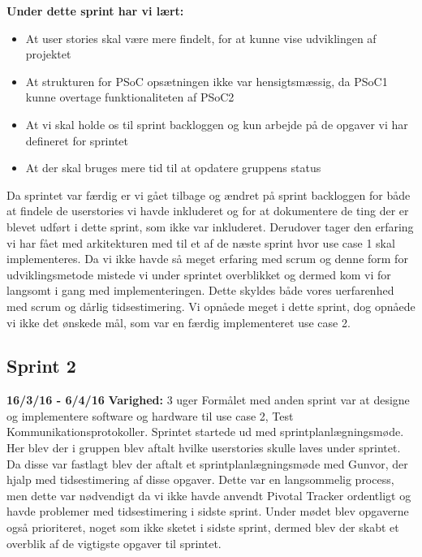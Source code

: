 	\textbf{Under dette sprint har vi lært:}
	\begin{itemize}
		\item At user stories skal være mere findelt, for at kunne vise udviklingen af projektet
		\item At strukturen for PSoC opsætningen ikke var hensigtsmæssig, da PSoC1 kunne overtage funktionaliteten af PSoC2
		\item At vi skal holde os til sprint backloggen og kun arbejde på de opgaver vi har defineret for sprintet
		\item At der skal bruges mere tid til at opdatere gruppens status
	\end{itemize}
	
	Da sprintet var færdig er vi gået tilbage og ændret på sprint backloggen for både at findele de userstories vi havde inkluderet og for at dokumentere de ting der er blevet udført i dette sprint, som ikke var inkluderet. Derudover tager den erfaring vi har fået med arkitekturen med til et af de næste sprint hvor use case 1 skal implementeres. Da vi ikke havde så meget erfaring med scrum og denne form for udviklingsmetode mistede vi under sprintet overblikket og dermed kom vi for langsomt i gang med implementeringen. Dette skyldes både vores uerfarenhed med scrum og dårlig tidsestimering. Vi opnåede meget i dette sprint, dog opnåede vi ikke det ønskede mål, som var en færdig implementeret use case 2. 
	
	
	
	\subsection{Sprint 2}
	\textbf{16/3/16 - 6/4/16}\newline
	\textbf{Varighed:} 3 uger\newline
	Formålet med anden sprint var at designe og implementere software og hardware til use case 2, Test Kommunikationsprotokoller. Sprintet startede ud med sprintplanlægningsmøde. Her blev der i gruppen blev aftalt hvilke userstories skulle laves under sprintet. Da disse var fastlagt blev der aftalt et sprintplanlægningsmøde med Gunvor, der hjalp med tidsestimering af disse opgaver. Dette var en langsommelig process, men dette var nødvendigt da vi ikke havde anvendt Pivotal Tracker ordentligt og havde problemer med tidsestimering i sidste sprint. Under mødet blev opgaverne også prioriteret, noget som ikke sketet i sidste sprint, dermed blev der skabt et overblik af de vigtigste opgaver til sprintet. \newline
	
